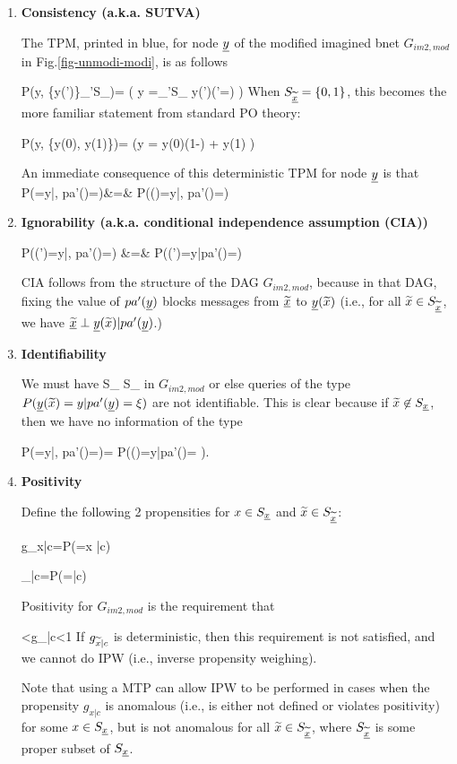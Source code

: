 \begin{enumerate}


\item {\bf Consistency (a.k.a. SUTVA)}

The TPM, printed in  blue, for node ${\underline{y}}$
of the modified imagined bnet $G_{im2,mod}$ in Fig.\ref{fig-unmodi-modi},
 is as follows

\beq \color{blue}
P(y\cond \tilx, \{y(\tilx')\}_{\tilx'\in S_{\ul{\tilx}}})=
\indi(
\quad y =\sum_{\tilx'\in S_{\ul{\tilx}}}
 y(\tilx')\indi(\tilx'=\tilx)
 \quad)
\eeq
When $S_{\underline{{{\widetilde{x}}}}}=\{0,1\}$,
this becomes the more familiar 
statement from standard 
PO theory:

\beq \color{blue}
P(y\cond \tilx, \{y(0), y(1)\})=
\indi(\quad y =
y(0)(1-\tilx)
+ 
y(1)\tilx
\quad)
\eeq

An immediate consequence
of this deterministic TPM for
node ${\underline{y}}$ is that
\beqa
P(\rvy=y|\tilx, pa'(\rvy)=\xi)&=&
P(\rvy(\tilx)=y|\tilx, pa'(\rvy)=\xi)
\eeqa


\item {\bf Ignorability (a.k.a.
conditional independence assumption (CIA))}

\beqa
P(\rvy(\tilx')=y|\tilx, pa'(\rvy)=\xi)
&=&
P(\rvy(\tilx')=y|pa'(\rvy)=\xi)
\eeqa

CIA follows from the structure
of the DAG $G_{im2,mod}$,
because in that
DAG, fixing the value
of $pa'({\underline{y}})$
blocks messages from $\underline{{{\widetilde{x}}}}$
to ${\underline{y}}({{\widetilde{x}}})$ (i.e.,
for all ${{\widetilde{x}}}\in S_{\underline{{{\widetilde{x}}}}}$,
we have  
$\underline{{{\widetilde{x}}}}
\perp {\underline{y}}({{\widetilde{x}}})|pa'({\underline{y}})$.)

\item {\bf Identifiability}

We must have
\beq
S_{\ul{\tilx}} \subset S_\rvx
\eeq
in $G_{im2, mod}$
or else queries of the type
 $P({\underline{y}}({{\widetilde{x}}})=y|pa'({\underline{y}})=\xi)$ are not identifiable.
This is clear because if ${{\widetilde{x}}}\not\in S_{\underline{x}}$,
then we have no information of the type

\beq
P(\rvy=y|\tilx, pa'(\rvy)=\xi)=
\quad P(\rvy(\tilx)=y|pa'(\rvy)=\xi
)\;.
\eeq

\item{\bf Positivity}

Define the following 2 propensities
for $x\in S_{\underline{x}}$ and ${{\widetilde{x}}} \in S_{\underline{{{\widetilde{x}}}}}$:

\beq
g_{x|c}=P(\rvx=x |c)
\eeq

\beq
\tilg_{\tilx|c}=P(\ul{\tilx}=\tilx |c)
\eeq

Positivity for  $G_{im2,mod}$
is the requirement that

<g_{\tilx|c}<1 
\eeq
If $g_{{{\widetilde{x}}}|c}$
is deterministic, then this requirement
is not satisfied, and we cannot do IPW (i.e.,
inverse propensity weighing).

Note that using a MTP can allow IPW to
be performed  in cases
when the propensity $g_{x|c}$
is anomalous
(i.e., is
either not defined
or violates positivity)
for some $x\in S_{\underline{x}}$, but is not anomalous
for all ${{\widetilde{x}}}\in S_{\underline{{{\widetilde{x}}}}}$, where
$S_{\underline{{{\widetilde{x}}}}}$
is some proper subset of $S_{\underline{x}}$.

\end{enumerate}


